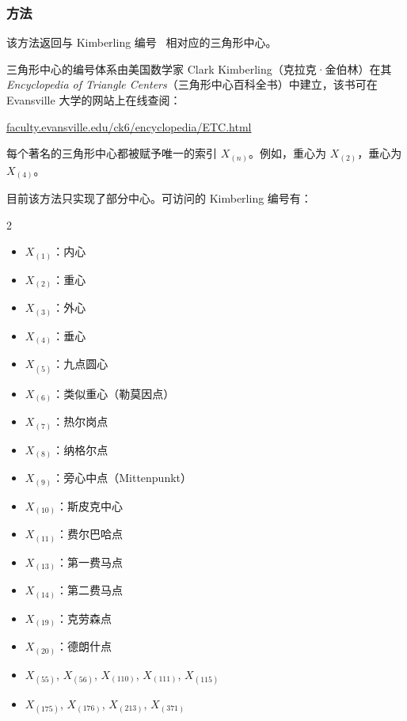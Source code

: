 \subsubsection{方法 }
\label{ssub:method_triangle_kimberling_n}

该方法返回与 Kimberling 编号~ 相对应的三角形中心。

\medskip

三角形中心的编号体系由美国数学家 Clark Kimberling（克拉克·金伯林）在其 \textit{Encyclopedia of Triangle Centers}（三角形中心百科全书）中建立，该书可在 Evansville 大学的网站上在线查阅：
\begin{center}
\href{http://faculty.evansville.edu/ck6/encyclopedia/ETC.html}{faculty.evansville.edu/ck6/encyclopedia/ETC.html}
\end{center}


每个著名的三角形中心都被赋予唯一的索引 $X_{(n)}$。例如，重心为 $X_{(2)}$，垂心为 $X_{(4)}$。

\medskip

目前该方法只实现了部分中心。可访问的 Kimberling 编号有：
\begin{multicols}{2}
\begin{itemize}
  \item $X_{(1)}$：内心
  \item $X_{(2)}$：重心
  \item $X_{(3)}$：外心
  \item $X_{(4)}$：垂心
  \item $X_{(5)}$：九点圆心
  \item $X_{(6)}$：类似重心（勒莫因点）
  \item $X_{(7)}$：热尔岗点
  \item $X_{(8)}$：纳格尔点
  \item $X_{(9)}$：旁心中点（Mittenpunkt）
  \item $X_{(10)}$：斯皮克中心
  \item $X_{(11)}$：费尔巴哈点
  \item $X_{(13)}$：第一费马点
  \item $X_{(14)}$：第二费马点
  \item $X_{(19)}$：克劳森点
  \item $X_{(20)}$：德朗什点
  \item $X_{(55)}$, $X_{(56)}$, $X_{(110)}$, $X_{(111)}$, $X_{(115)}$
  \item $X_{(175)}$, $X_{(176)}$, $X_{(213)}$, $X_{(371)}$
\end{itemize}
\end{multicols}



